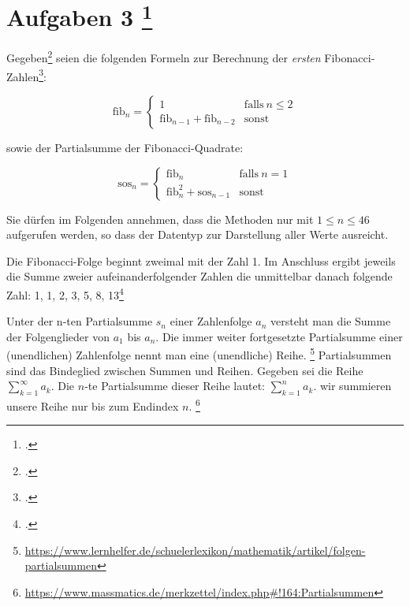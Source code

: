 \documentclass{bschlangaul-aufgabe}
\begin{document}

\section{Aufgaben 3
\footcite[Seite 1, Aufgabe 1]{aud:pu:3}}

Gegeben\footcite[Thema 1 Aufgabe 3 Seite 5]{examen:66115:2017:03} seien
die folgenden Formeln zur Berechnung der \emph{ersten}
Fibonacci-Zahlen\footcite{wiki:fibonacci-folge}:

\begin{equation*}
\text{fib}_n =
\begin{cases}
1 & \text{falls}\ n \leq 2\\
\text{fib}_{n-1} + \text{fib}_{n-2} & \text{sonst}
\end{cases}
\end{equation*}

\noindent
sowie der Partialsumme der Fibonacci-Quadrate:

\begin{equation*}
\text{sos}_n =
\begin{cases}
\text{fib}_n & \text{falls}\ n = 1\\
\text{fib}_n^2 + \text{sos}_{n-1} & \text{sonst}
\end{cases}
\end{equation*}

\noindent
Sie dürfen im Folgenden annehmen, dass die Methoden nur mit $1 \leq n
\leq 46$ aufgerufen werden, so dass der Datentyp  zur
Darstellung aller Werte ausreicht.

\begin{bExkurs}
Die Fibonacci-Folge beginnt zweimal mit der Zahl 1. Im Anschluss ergibt
jeweils die Summe zweier aufeinanderfolgender Zahlen die unmittelbar
danach folgende Zahl: 1, 1, 2, 3, 5, 8,
13\footcite{wiki:fibonacci-folge}
\end{bExkurs}

\begin{bExkurs}[Partialsumme]
Unter der n-ten Partialsumme $s_n$ einer Zahlenfolge $a_n$ versteht man
die Summe der Folgenglieder von $a_1$ bis $a_n$. Die immer
weiter fortgesetzte Partialsumme einer (unendlichen) Zahlenfolge nennt
man eine (unendliche) Reihe.
\footnote{\url{https://www.lernhelfer.de/schuelerlexikon/mathematik/artikel/folgen-partialsummen}}
Partialsummen sind das Bindeglied zwischen Summen und Reihen.
Gegeben sei die Reihe $\sum_{k = 1}^{\infty} a_k$.
Die $n$-te Partialsumme dieser Reihe lautet: $\sum_{k = 1}^{n} a_k$.
\dh wir summieren unsere Reihe nur bis zum Endindex $n$.
\footnote{\url{https://www.massmatics.de/merkzettel/index.php\#!164:Partialsummen}}
\end{bExkurs}
\end{document}
